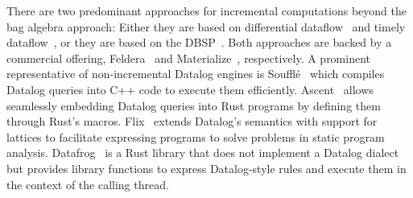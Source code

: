 There are two predominant approaches for incremental computations beyond
the bag algebra approach:
Either they are based on differential dataflow~\cite{mcsherry2013differential}
and timely dataflow~\cite{timelydataflow}, or they are based on
the DBSP~\cite{budiu2024dbsp, budiu2025dbsp}.
Both approaches are backed by a commercial offering,
Feldera~\cite{felderainc} and Materialize~\cite{materializeinc}, respectively.
A prominent representative of non-incremental Datalog engines is
Soufflé~\cite{souffle} which compiles Datalog queries into C++ code to execute
them efficiently.
Ascent~\cite{ascent} allows seamlessly embedding Datalog queries into Rust
programs by defining them through Rust's macros.
Flix~\cite{flix} extends Datalog's semantics with support for lattices to
facilitate expressing programs to solve problems in static program analysis.
Datafrog~\cite{datafrog} is a Rust library that does not implement a Datalog
dialect but provides library functions to express Datalog-style rules and
execute them in the context of the calling thread.
